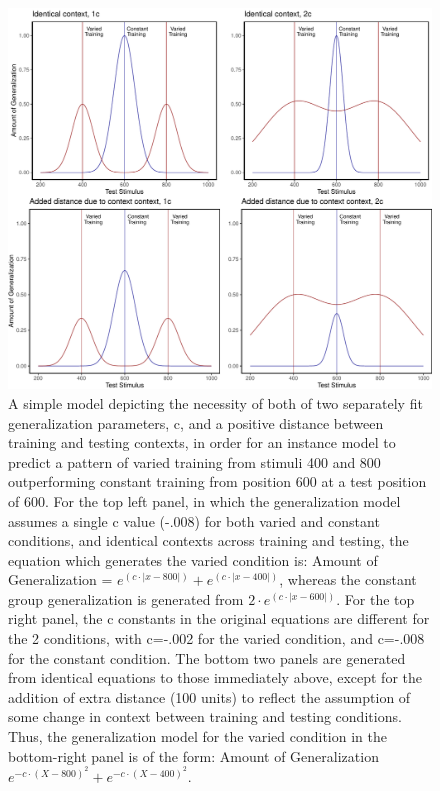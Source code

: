 \documentclass[
  jou, donotrepeattitle,floatsintext]{apa7}
\begin{document}
\begin{figure}
\centering
\includegraphics{IGAS_PJ_files/figure-latex/ModelFig2-1.pdf}
\caption{\label{fig:ModelFig2}A simple model depicting the necessity of both of two separately fit generalization parameters, c, and a positive distance between training and testing contexts, in order for an instance model to predict a pattern of varied training from stimuli 400 and 800 outperforming constant training from position 600 at a test position of 600. For the top left panel, in which the generalization model assumes a single c value (-.008) for both varied and constant conditions, and identical contexts across training and testing, the equation which generates the varied condition is: Amount of Generalization = \(e^{(c\cdot|x-800|)} +e^{(c\cdot|x-400|)}\), whereas the constant group generalization is generated from \(2\cdot e^{(c\cdot|x-600|)}\). For the top right panel, the c constants in the original equations are different for the 2 conditions, with c=-.002 for the varied condition, and c=-.008 for the constant condition. The bottom two panels are generated from identical equations to those immediately above, except for the addition of extra distance (100 units) to reflect the assumption of some change in context between training and testing conditions. Thus, the generalization model for the varied condition in the bottom-right panel is of the form: Amount of Generalization \(e^{-c\cdot(X-800)^2}+e^{-c\cdot(X-400)^2}\).}
\end{figure}
\end{document}
